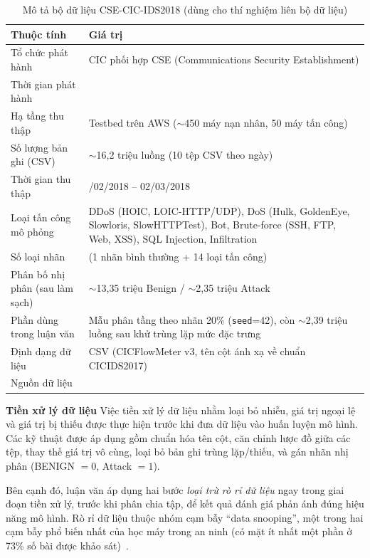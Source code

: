 \begin{table}[htbp]
\centering
\caption{Mô tả bộ dữ liệu CSE-CIC-IDS2018 (dùng cho thí nghiệm liên bộ dữ liệu)}
\label{tab:cicids2018}
\renewcommand{\arraystretch}{1.1}
\small
\begin{tabular}{l@{\hspace{10pt}}>{\raggedright\arraybackslash}p{9cm}}
\toprule
\textbf{Thuộc tính}              & \textbf{Giá trị} \\
\midrule
Tổ chức phát hành                & CIC phối hợp CSE (Communications Security Establishment) \\
Thời gian phát hành              & 2018 \\
Hạ tầng thu thập                 & Testbed trên AWS ($\sim$450 máy nạn nhân, 50 máy tấn công) \\
Số lượng bản ghi (CSV)           & $\sim$16{,}2 triệu luồng (10 tệp CSV theo ngày) \\
Thời gian thu thập               & 14/02/2018 -- 02/03/2018 \\
Loại tấn công mô phỏng           & DDoS (HOIC, LOIC-HTTP/UDP), DoS (Hulk, GoldenEye, Slowloris, SlowHTTPTest), Bot, Brute-force (SSH, FTP, Web, XSS), SQL Injection, Infiltration \\
Số loại nhãn                     & 15 (1 nhãn bình thường + 14 loại tấn công) \\
Phân bố nhị phân (sau làm sạch)  & $\sim$13{,}35 triệu Benign / $\sim$2{,}35 triệu Attack \\
Phần dùng trong luận văn          & Mẫu phân tầng theo nhãn 20\% (\texttt{seed}=42), còn $\sim$2{,}39 triệu luồng sau khử trùng lặp mức đặc trưng \\
Định dạng dữ liệu                & CSV (CICFlowMeter v3, tên cột ánh xạ về chuẩn CICIDS2017) \\
Nguồn dữ liệu                    & \cite{csecicids2018} \\
\bottomrule
\end{tabular}
\end{table}

\break

\textbf{Tiền xử lý dữ liệu}
Việc tiền xử lý dữ liệu nhằm loại bỏ nhiễu, giá trị ngoại lệ và giá trị bị thiếu được thực hiện trước khi đưa dữ liệu vào huấn luyện mô hình. Các kỹ thuật được áp dụng gồm chuẩn hóa tên cột, căn chỉnh lược đồ giữa các tệp, thay thế giá trị vô cùng, loại bỏ bản ghi trùng lặp/thiếu, và gán nhãn nhị phân (BENIGN $=0$, Attack $=1$).

Bên cạnh đó, luận văn áp dụng hai bước \emph{loại trừ rò rỉ dữ liệu} ngay trong giai đoạn tiền xử lý, trước khi phân chia tập, để kết quả đánh giá phản ánh đúng hiệu năng mô hình. Rò rỉ dữ liệu thuộc nhóm cạm bẫy ``data snooping'', một trong hai cạm bẫy phổ biến nhất của học máy trong an ninh (có mặt ít nhất một phần ở 73\% số bài được khảo sát)~\cite{arp2022dosdonts}.

